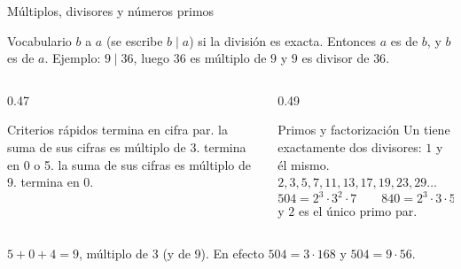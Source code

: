 \documentclass[aspectratio=169,10pt]{beamer}
\begin{document}
	
	\begin{frame}{Múltiplos, divisores y números primos}
		\scriptsize
		\begin{block}{Vocabulario}
			\tiny
			$b$  a $a$ (se escribe $b\mid a$) si la división es exacta.
			Entonces $a$ es  de $b$, y $b$ es  de $a$.
			Ejemplo: $9\mid 36$, luego $36$ es múltiplo de $9$ y $9$ es divisor
			de $36$.
		\end{block}
		
		\vspace{0.08cm}
		\begin{columns}[T,onlytextwidth]
			\begin{column}{0.47\textwidth}
				\begin{exampleblock}{Criterios rápidos}
					\tiny
					 termina en cifra par. \quad
					 la suma de sus cifras es múltiplo de 3. \quad
					 termina en 0 o 5. \quad
					 la suma de sus cifras es múltiplo de 9. \quad
					 termina en 0.
				\end{exampleblock}
			\end{column}
			\begin{column}{0.49\textwidth}
				\begin{block}{Primos y factorización}
					\tiny
					Un  tiene exactamente dos divisores: $1$ y él mismo.
					$2,3,5,7,11,13,17,19,23,29\dots$
					\[ 504 = 2^{3}\cdot 3^{2}\cdot 7 \qquad
					840 = 2^{3}\cdot 3\cdot 5\cdot 7 \]
					 y $2$ es el único primo par.
				\end{block}
			\end{column}
		\end{columns}
		
		\vspace{0.08cm}
		{\tiny\color{uniGris} 
			$5+0+4 = 9$, múltiplo de 3 (y de 9). En efecto $504 = 3\cdot 168$ y
			$504 = 9\cdot 56$.}
	\end{frame}
	
\end{document}
